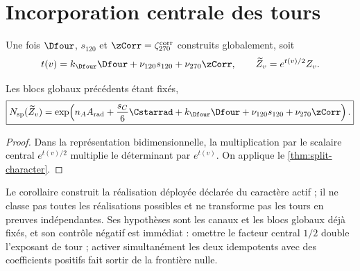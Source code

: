 \section{Incorporation centrale des tours}
\label{sec:factorizacion-split-torres}

Une fois \(\Dfour\), \(s_{120}\) et \(\zCorr=\zeta_{270}^{\rm corr}\) construits globalement, soit
\[
 t(v)=
 k_{\Dfour}\Dfour
 +\nu_{120}s_{120}
 +\nu_{270}\zCorr,
 \qquad
 \widetilde Z_v=e^{t(v)/2}Z_v.
\]

\begin{corollary}
\label{cor:split-character-torres} Les blocs globaux précédents étant fixés,
\[
 \boxed{
 N_{\rm sp}(\widetilde Z_v)
 =\exp\!\left(
 n_AA_{\rm rad}+\frac{s_C}{6}\Cstarrad
 +k_{\Dfour}\Dfour+\nu_{120}s_{120}
 +\nu_{270}\zCorr
 \right).}
\]
\end{corollary}

\begin{proof}
Dans la représentation bidimensionnelle, la multiplication par le scalaire central \(e^{t(v)/2}\) multiplie le déterminant par \(e^{t(v)}\). On applique le \cref{thm:split-character}.
\end{proof}

Le corollaire construit la réalisation déployée déclarée du caractère actif ; il ne classe pas toutes les réalisations possibles et ne transforme pas les tours en preuves indépendantes. Ses hypothèses sont les canaux et les blocs globaux déjà fixés, et son contrôle négatif est immédiat : omettre le facteur central \(1/2\) double l'exposant de tour ; activer simultanément les deux idempotents avec des coefficients positifs fait sortir de la frontière nulle.

